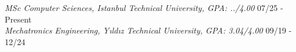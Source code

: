 \documentclass[letter,14pt]{article}
\begin{document}
\textit{MSc Computer Sciences, Istanbul Technical University, GPA: ../4.00} \hfill 07/25 - Present\\
\textit{Mechatronics Engineering, Yıldız Technical University, GPA: 3.04/4.00} 	\hfill 09/19 - 12/24 \\ 
\end{document}
